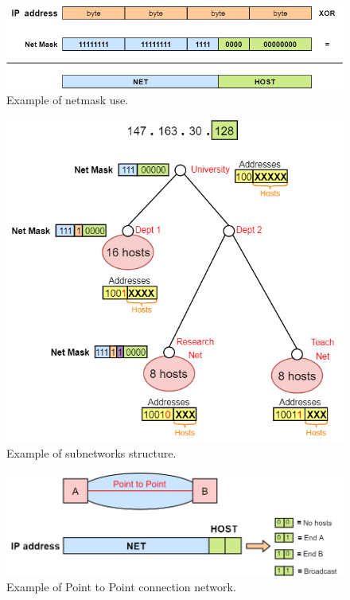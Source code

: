 \begin{figure}[h]
\centering
\includegraphics[scale=0.5]{Images/IP/netmask}
\caption{\footnotesize{Example of netmask use.}}\label{netmask}
\end{figure}
\begin{figure}[h]
\centering
\includegraphics[scale=0.55]{Images/IP/dei_ip}
\caption{\footnotesize{Example of subnetworks structure.}}\label{dei_ip}
\end{figure}
\begin{figure}[h]
\centering
\includegraphics[scale=0.4]{Images/IP/point2point}
\caption{\footnotesize{Example of Point to Point connection network.}}\label{point2point}
\end{figure}
\clearpage
